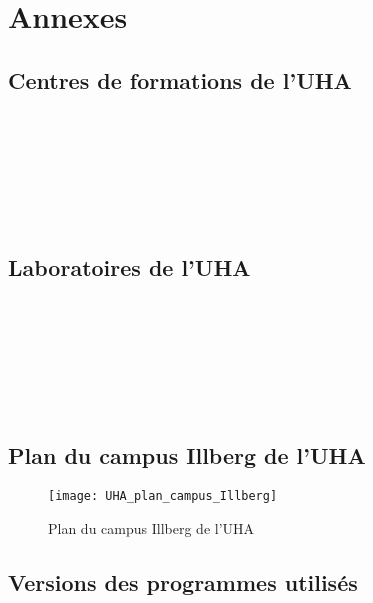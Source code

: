 \documentclass[a4paper,11pt,twoside,french,report]{../common/simplem}
\begin{document}
	\chapter*{Annexes}
		\setcounter{section}{0}
		\renewcommand{\thesection}{\Alph{section}}
		\renewcommand{\theHsection}{appendixsection.\Alph{section}}
		\section{Centres de formations de l'\acrshort{UHA}}\label{sec:uha_formation}
			\paragraph*{}
				
				\hfill\\
			\paragraph*{}
				
				\hfill\\
			\paragraph*{}
				
				\hfill\\
		\newpage\section{Laboratoires de l'\acrshort{UHA}}\label{sec:uha_laboratories}
			\paragraph*{}
				
				\hfill\\
			\paragraph*{}
				
				\hfill\\
			\paragraph*{}
				
				\hfill\\
		\newpage\section{Plan du campus Illberg de l'\acrshort{UHA}}\label{sec:uha_illberg_map}
			\begin{figure}[H]
				\centering%
				\texttt{[image: UHA\_plan\_campus\_Illberg]}%
				\caption{Plan du campus Illberg de l'\acrshort{UHA}~\cite{UHA_Plan_acces}}%
				\label{fig:UHA_plan_campus_Illberg}%
			\end{figure}
		\newpage\section{Versions des programmes utilisés}\label{sec:programs_versions}
\end{document}
